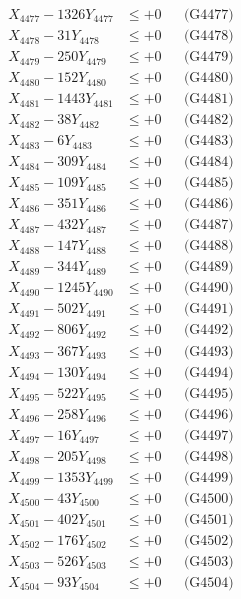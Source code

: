 \documentclass[a4paper,10pt]{article}
\begin{document}
{\begin{align}
X_{4477} - 1326Y_{4477} &\leq +0 && \text{(G4477)} \\
X_{4478} - 31Y_{4478} &\leq +0 && \text{(G4478)} \\
X_{4479} - 250Y_{4479} &\leq +0 && \text{(G4479)} \\
X_{4480} - 152Y_{4480} &\leq +0 && \text{(G4480)} \\
\allowbreak
X_{4481} - 1443Y_{4481} &\leq +0 && \text{(G4481)} \\
X_{4482} - 38Y_{4482} &\leq +0 && \text{(G4482)} \\
X_{4483} - 6Y_{4483} &\leq +0 && \text{(G4483)} \\
X_{4484} - 309Y_{4484} &\leq +0 && \text{(G4484)} \\
X_{4485} - 109Y_{4485} &\leq +0 && \text{(G4485)} \\
X_{4486} - 351Y_{4486} &\leq +0 && \text{(G4486)} \\
X_{4487} - 432Y_{4487} &\leq +0 && \text{(G4487)} \\
X_{4488} - 147Y_{4488} &\leq +0 && \text{(G4488)} \\
X_{4489} - 344Y_{4489} &\leq +0 && \text{(G4489)} \\
X_{4490} - 1245Y_{4490} &\leq +0 && \text{(G4490)} \\
\allowbreak
X_{4491} - 502Y_{4491} &\leq +0 && \text{(G4491)} \\
X_{4492} - 806Y_{4492} &\leq +0 && \text{(G4492)} \\
X_{4493} - 367Y_{4493} &\leq +0 && \text{(G4493)} \\
X_{4494} - 130Y_{4494} &\leq +0 && \text{(G4494)} \\
X_{4495} - 522Y_{4495} &\leq +0 && \text{(G4495)} \\
X_{4496} - 258Y_{4496} &\leq +0 && \text{(G4496)} \\
X_{4497} - 16Y_{4497} &\leq +0 && \text{(G4497)} \\
X_{4498} - 205Y_{4498} &\leq +0 && \text{(G4498)} \\
X_{4499} - 1353Y_{4499} &\leq +0 && \text{(G4499)} \\
X_{4500} - 43Y_{4500} &\leq +0 && \text{(G4500)} \\
\allowbreak
X_{4501} - 402Y_{4501} &\leq +0 && \text{(G4501)} \\
X_{4502} - 176Y_{4502} &\leq +0 && \text{(G4502)} \\
X_{4503} - 526Y_{4503} &\leq +0 && \text{(G4503)} \\
X_{4504} - 93Y_{4504} &\leq +0 && \text{(G4504)} \\

\end{align}}
\end{document}
